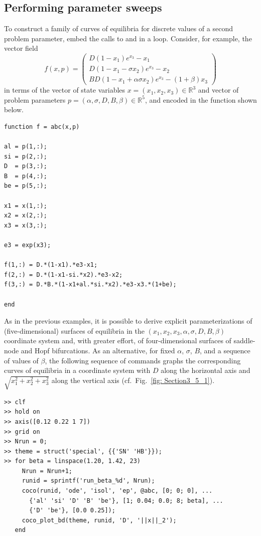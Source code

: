 \subsection{Performing parameter sweeps}
\label{sec: Performing parameter sweeps}
To construct a family of curves of equilibria for discrete values of a second problem parameter, embed the calls to  and  in a loop. Consider, for example, the vector field
\[
f(x,p)=\begin{pmatrix}D(1-x_1)e^{x_3}-x_1\\D(1-x_1-\sigma x_2)e^{x_3}-x_2\\BD(1-x_1+\alpha\sigma x_2)e^{x_3}-(1+\beta) x_3\end{pmatrix}
\]
in terms of the vector of state variables $x=(x_1,x_2,x_3)\in\mathbb{R}^3$ and vector of problem parameters $p=(\alpha,\sigma,D,B,\beta)\in\mathbb{R}^5$, and encoded in the function  shown below.
\begin{lstlisting}[language=coco-highlight,frame=shadowbox]
function f = abc(x,p)

al = p(1,:);
si = p(2,:);
D  = p(3,:);
B  = p(4,:);
be = p(5,:);

x1 = x(1,:);
x2 = x(2,:);
x3 = x(3,:);

e3 = exp(x3);

f(1,:) = D.*(1-x1).*e3-x1;
f(2,:) = D.*(1-x1-si.*x2).*e3-x2;
f(3,:) = D.*B.*(1-x1+al.*si.*x2).*e3-x3.*(1+be);

end
\end{lstlisting}
As in the previous examples, it is possible to derive explicit parameterizations of (five-dimensional) surfaces of equilibria in the $(x_1,x_2,x_3,\alpha,\sigma,D,B,\beta)$ coordinate system and, with greater effort, of four-dimensional surfaces of saddle-node and Hopf bifurcations. As an alternative, for fixed $\alpha$, $\sigma$, $B$, and a sequence of values of $\beta$, the following sequence of commands graphs the corresponding curves of equilibria in a coordinate system with $D$ along the horizontal axis and $\sqrt{x_1^2+x_2^2+x_3^2}$ along the vertical axis (cf.\ Fig.~\ref{fig: Section3_5_1}).
\begin{lstlisting}[language=coco-highlight,frame=lines]
>> clf
>> hold on
>> axis([0.12 0.22 1 7])
>> grid on
>> Nrun = 0;
>> theme = struct('special', {{'SN' 'HB'}});
>> for beta = linspace(1.20, 1.42, 23)
     Nrun = Nrun+1;
     runid = sprintf('run_beta_%d', Nrun);
     coco(runid, 'ode', 'isol', 'ep', @abc, [0; 0; 0], ...
       {'al' 'si' 'D' 'B' 'be'}, [1; 0.04; 0.0; 8; beta], ...
       {'D' 'be'}, [0.0 0.25]);
     coco_plot_bd(theme, runid, 'D', '||x||_2');
   end
\end{lstlisting}
